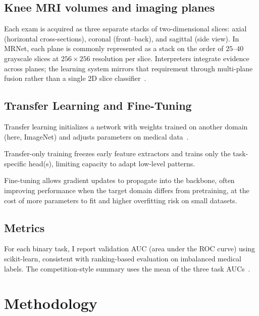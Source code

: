 \documentclass[10pt,twocolumn]{article}
\begin{document}
\subsection{Knee MRI volumes and imaging planes}

Each exam is acquired as three separate stacks of two-dimensional slices: axial (horizontal cross-sections), coronal (front--back), and sagittal (side view). In MRNet, each plane is commonly represented as a stack on the order of $25$--$40$ grayscale slices at $256\times 256$ resolution per slice. Interpreters integrate evidence across planes; the learning system mirrors that requirement through multi-plane fusion rather than a single 2D slice classifier~\cite{bien2020deep}.

\subsection{Transfer Learning and Fine-Tuning}

Transfer learning initializes a network with weights trained on another domain (here, ImageNet) and adjusts parameters on medical data~\cite{deng2009imagenet, he2016deep}.

Transfer-only training freezes early feature extractors and trains only the task-specific head(s), limiting capacity to adapt low-level patterns.

Fine-tuning allows gradient updates to propagate into the backbone, often improving performance when the target domain differs from pretraining, at the cost of more parameters to fit and higher overfitting risk on small datasets.

\subsection{Metrics}

For each binary task, I report validation AUC (area under the ROC curve) using scikit-learn, consistent with ranking-based evaluation on imbalanced medical labels. The competition-style summary uses the mean of the three task AUCs~\cite{bien2020deep}.

\section{Methodology}
\label{sec:methodology}
\end{document}
